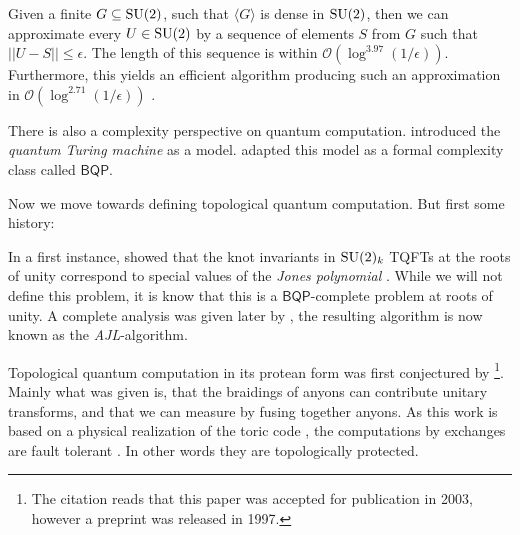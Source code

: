 \begin{theorem}
  Given a finite $G \subseteq \mathrm{SU}(2)$, such that $\langle G \rangle$ is dense in
  $\mathrm{SU}(2)$, then we can approximate every $U \in \mathrm{SU}(2)$ by a sequence of
  elements $S$ from $G$ such that $|| U - S || \leq \epsilon$. The length of
  this sequence is within $\mathcal{O}\left(\log^{3.97}(1/\epsilon)\right)$.
  Furthermore, this yields an efficient algorithm producing such an
  approximation in $\mathcal{O}\left(\log^{2.71}(1/\epsilon)\right)$
  \cite{dawsonSolovayKitaevAlgorithm2005a}. 
\end{theorem}



There is also a complexity perspective on quantum computation. \textcite{deutschQuantumTheoryChurch1985} introduced the \emph{quantum Turing machine} as a model. \textcite{doi:10.1137/S0097539796300921} adapted this model as a formal complexity class called $\mathsf{BQP}$. 


Now we move towards defining topological quantum computation. But first some
history:

In a first instance, \textcite{wittenQuantumFieldTheory1989} showed that the
knot invariants in $\mathrm{SU}(2)_k$ TQFTs at the roots of unity correspond to special
values of the \emph{Jones polynomial} \cite{jonesPolynomialInvariantKnots1985}.
While we will not define this problem, it is know that this is a
$\mathsf{BQP}$-complete problem \cite{jaegerComputationalComplexityJones1990} at
roots of unity. A complete analysis was given later by
\textcite{aharonovPolynomialQuantumAlgorithm2006}, the resulting algorithm is
now known as the \emph{AJL}-algorithm.

Topological quantum computation in its protean form was first conjectured by
\textcite[~Appendix E]{kitaevFaulttolerantQuantumComputation2003}\footnote{The
citation reads that this paper was accepted for publication in 2003, however a
preprint was released in 1997.}. Mainly what was given is, that the braidings of
anyons can contribute unitary transforms, and that we can measure by fusing
together anyons. As this work is based on a physical realization of the toric
code \cite{kitaevQuantumComputationsAlgorithms1997}, the computations by
exchanges are fault tolerant . In other words they are topologically protected. 


